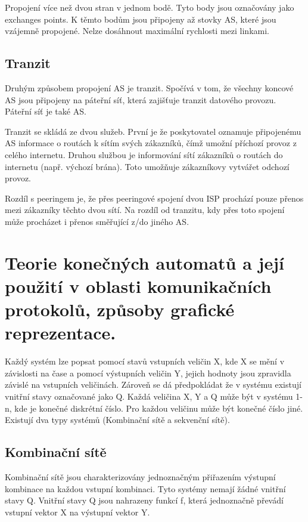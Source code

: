 Propojení více než dvou stran v jednom bodě.
Tyto body jsou označovány jako exchanges points.
K těmto bodům jsou připojeny až stovky AS, které jsou vzájemně propojené.
Nelze dosáhnout maximální rychlosti mezi linkami.

\subsection{Tranzit}

Druhým způsobem propojení AS je tranzit.
Spočívá v tom, že všechny koncové AS jsou připojeny na páteřní síť, která zajišťuje tranzit datového provozu.
Páteřní síť je také AS.

Tranzit se skládá ze dvou služeb.
První je že poskytovatel oznamuje připojenému AS informace o routách k sítím svých zákazníků, čímž umožní příchozí provoz z celého internetu.
Druhou službou je informování sítí zákazníků o routách do internetu (např. výchozí brána).
Toto umožňuje zákazníkovy vytvářet odchozí provoz.

Rozdíl s peeringem je, že přes peeringové spojení dvou ISP prochází pouze přenos mezi zákazníky těchto dvou sítí.
Na rozdíl od tranzitu, kdy přes toto spojení může procházet i přenos směřující z/do jiného AS.


\clearpage
\section{Teorie konečných automatů a její použití v oblasti komunikačních protokolů, způsoby grafické reprezentace.}

Každý systém lze popsat pomocí stavů vstupních veličin X, kde X se mění v závislosti na čase a pomocí výstupních veličin Y, jejich hodnoty jsou zpravidla závislé na vstupních veličinách.
Zároveň se dá předpokládat že v systému existují vnitřní stavy označované jako Q.
Každá veličina X, Y a Q může být v systému 1-n, kde je konečné diskrétní číslo.
Pro každou veličinu může být konečné číslo jiné.
Existují dva typy systémů (Kombinační sítě a sekvenční sítě).

\subsection{Kombinační sítě}

Kombinační sítě jsou charakterizovány jednoznačným přiřazením výstupní kombinace na každou vstupní kombinaci.
Tyto systémy nemají žádné vnitřní stavy Q.
Vnitřní stavy Q jsou nahrazeny funkcí f, která jednoznačně převádí vstupní vektor X na výstupní vektor Y.

